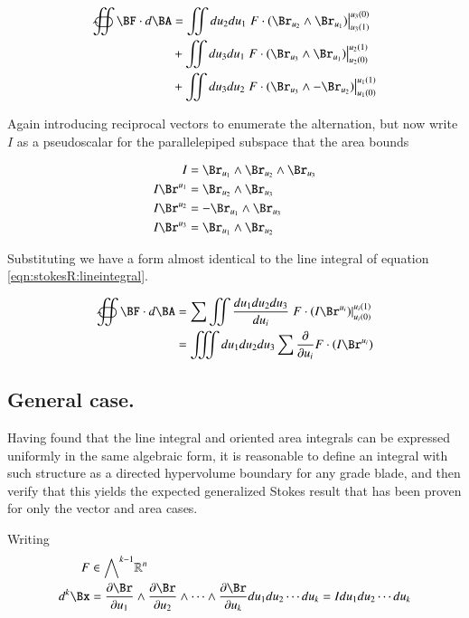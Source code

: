 \begin{align*}
\oiintclockwise \BF \cdot d\BA
&= \iint du_2 du_1 \left.{F \cdot (\Br_{u_2} \wedge \Br_{u_1})}\right\vert_{u_3(1)}^{u_3(0)} \\
& +\iint du_3 du_1 \left.{F \cdot (\Br_{u_3} \wedge \Br_{u_1})}\right\vert_{u_2(0)}^{u_2(1)} \\
& +\iint du_3 du_2 \left.{F \cdot (\Br_{u_3} \wedge -\Br_{u_2})}\right\vert_{u_1(0)}^{u_1(1)} \\
\end{align*}

Again introducing reciprocal vectors to enumerate the alternation, but now write $I$ as a pseudoscalar
for the parallelepiped subspace that the area bounds

\begin{align*}
I &= \Br_{u_1} \wedge \Br_{u_2} \wedge \Br_{u_3} \\
I \Br^{u_1} &= \Br_{u_2} \wedge \Br_{u_3} \\
I \Br^{u_2} &= -\Br_{u_1} \wedge \Br_{u_3} \\
I \Br^{u_3} &= \Br_{u_1} \wedge \Br_{u_2} \\
\end{align*}

Substituting we have a form almost identical to the line integral of equation \ref{eqn:stokesR:lineintegral}.

\begin{align}
\oiintclockwise \BF \cdot d\BA 
&= \sum \iint \frac{du_1 du_2 du_3}{du_i} \left.{F \cdot (I \Br^{u_i})}\right\vert_{u_i(0)}^{u_i(1)} \\
&= \iiint du_1 du_2 du_3 \sum \PD{u_i}{} F \cdot (I \Br^{u_i})
\end{align}

\subsection{General case. }

Having found that the line integral and oriented area integrals can be expressed uniformly in the same algebraic form, it
is reasonable to define an integral with such structure as a directed hypervolume boundary for any grade blade, and then verify that
this yields the expected generalized Stokes result that has been proven for only the vector and area cases.

Writing
\begin{align*}
F &\in {\bigwedge}^{k-1} \Rm{n} \\
d^k \Bx &= \PD{u_1}{\Br} \wedge \PD{u_2}{\Br} \wedge \cdots \wedge \PD{u_k}{\Br} du_1 du_2 \cdots du_k = I du_1 du_2 \cdots du_k \\
\end{align*}

